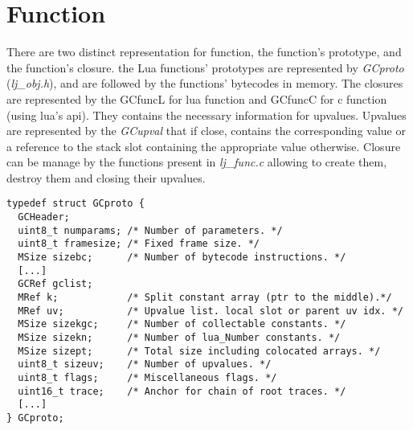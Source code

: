 \section{Function}
\label{Sec:func}

There are two distinct representation for function, the function's prototype,
and the function's closure. the Lua functions' prototypes are represented by \emph{GCproto} (\emph{lj\_obj.h}), and are followed by the functions' bytecodes in memory.
The closures are represented by the GCfuncL for lua function and GCfuncC for
c function (using lua's api). They contains the necessary information for
upvalues. Upvalues are represented by the \emph{GCupval} that if close, contains
the corresponding value or a reference to the stack slot containing the
appropriate value otherwise. Closure can be manage by the functions present in
\emph{lj\_func.c} allowing to create them, destroy them and closing their
upvalues.

\begin{lstlisting}[style=CStyle]
typedef struct GCproto {
  GCHeader;
  uint8_t numparams; /* Number of parameters. */
  uint8_t framesize; /* Fixed frame size. */
  MSize sizebc;      /* Number of bytecode instructions. */
  [...]
  GCRef gclist;
  MRef k;            /* Split constant array (ptr to the middle).*/
  MRef uv;           /* Upvalue list. local slot or parent uv idx. */
  MSize sizekgc;     /* Number of collectable constants. */
  MSize sizekn;      /* Number of lua_Number constants. */
  MSize sizept;      /* Total size including colocated arrays. */
  uint8_t sizeuv;    /* Number of upvalues. */
  uint8_t flags;     /* Miscellaneous flags. */
  uint16_t trace;    /* Anchor for chain of root traces. */
  [...]
} GCproto;
\end{lstlisting}
